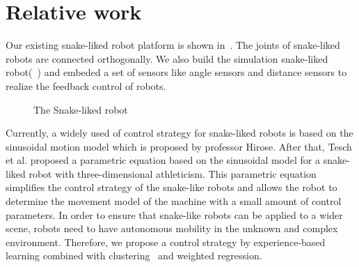 \section{Relative work}
Our existing snake-liked robot platform is shown in~. The joints of snake-liked robots are connected orthogonally. We also build the simulation snake-liked robot(~) and embeded a set of sensors like angle sensors and distance sensors to realize the feedback control of robots.
\begin{figure}[!t]
	\centering
	\caption{The Snake-liked robot}
\end{figure}

Currently, a widely used of control strategy for snake-liked robots is based on the sinusoidal motion model\cite{HiroseSine} which is proposed by professor Hirose. After that, Tesch et al. proposed a parametric equation based on the sinusoidal model for a snake-liked robot with three-dimensional athleticism\cite{ChosetSine}. This parametric equation simplifies the control strategy of the snake-like robots and allows the robot to determine the movement model of the machine with a small amount of control parameters. In order to ensure that snake-like robots can be applied to a wider scene, robots need to have autonomous mobility in the unknown and complex environment. Therefore, we propose a control strategy by experience-based learning combined with clustering~\cite{Cluseter_ICT,KmeansAndDeepLearning} and weighted regression.

